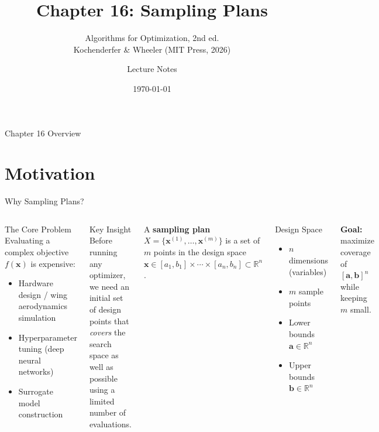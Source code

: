 \documentclass[aspectratio=169,10pt]{beamer}
\title[Chapter 16: Sampling Plans]{Chapter 16: Sampling Plans}
\subtitle{Algorithms for Optimization, 2nd ed.\\
  Kochenderfer \& Wheeler (MIT Press, 2026)}
\author{Lecture Notes}
\date{\today}
\institute{Based on Kochenderfer \& Wheeler --- Algorithms for Optimization}
\begin{document}

\begin{frame}
  \titlepage
\end{frame}

\begin{frame}{Chapter 16 Overview}
  \tableofcontents
\end{frame}

\section{Motivation}

\begin{frame}{Why Sampling Plans?}
  \begin{columns}
    \begin{block}{The Core Problem}
      Evaluating a complex objective $f(\mathbf{x})$ is expensive:
      \begin{itemize}
        \item Hardware design / wing aerodynamics simulation
        \item Hyperparameter tuning (deep neural networks)
        \item Surrogate model construction
      \end{itemize}
    \end{block}
    \vspace{0.4em}
    \begin{alertblock}{Key Insight}
      Before running any optimizer, we need an initial set of design
      points that \emph{covers} the search space as well as possible
      using a limited number of evaluations.
    \end{alertblock}
    \vspace{0.4em}
    A \textbf{sampling plan} $X = \{\mathbf{x}^{(1)},\ldots,\mathbf{x}^{(m)}\}$
    is a set of $m$ points in the design space
    $\mathbf{x} \in [a_1,b_1]\times\cdots\times[a_n,b_n] \subset \mathbb{R}^n$.

    \begin{exampleblock}{Design Space}
      \begin{itemize}
        \item $n$ dimensions (variables)
        \item $m$ sample points
        \item Lower bounds $\mathbf{a} \in \mathbb{R}^n$
        \item Upper bounds $\mathbf{b} \in \mathbb{R}^n$
      \end{itemize}
    \end{exampleblock}
    \vspace{0.3em}
    \textbf{Goal:} maximize coverage of $[\mathbf{a},\mathbf{b}]^n$
    while keeping $m$ small.
  \end{columns}
\end{frame}
\end{document}
